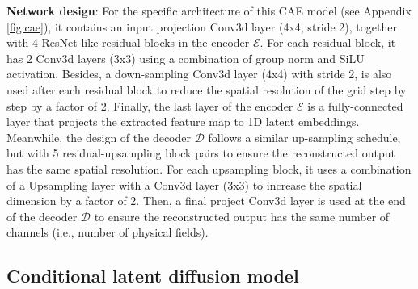 \documentclass[final-report]{article-template}
\begin{document}
\textbf{Network design}: For the specific architecture of this CAE model (see Appendix \ref{fig:cae}), it contains an input projection Conv3d layer (4x4, stride 2), together with 4 ResNet-like residual blocks in the encoder $\mathcal{E}$. For each residual block, it has 2 Conv3d layers (3x3) using a combination of group norm and SiLU activation. Besides, a down-sampling Conv3d layer (4x4) with stride 2, is also used after each residual block to reduce the spatial resolution of the grid step by step by a factor of 2. Finally, the last layer of the encoder $\mathcal{E}$ is a fully-connected layer that projects the extracted feature map to 1D latent embeddings. Meanwhile, the design of the decoder $\mathcal{D}$ follows a similar up-sampling schedule, but with 5 residual-upsampling block pairs to ensure the reconstructed output has the same spatial resolution. For each upsampling block, it uses a combination of a Upsampling layer with a Conv3d layer (3x3) to increase the spatial dimension by a factor of 2. Then, a final project Conv3d layer is used at the end of the decoder $\mathcal{D}$ to ensure the reconstructed output has the same number of channels (i.e., number of physical fields). 

\subsection{Conditional latent diffusion model}
\end{document}
